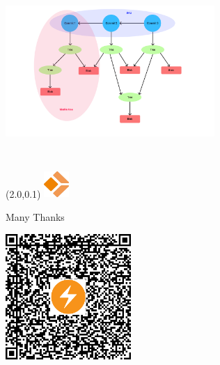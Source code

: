\documentclass[11pt,xcolor={dvipsnames}]{beamer} %
\newcommand{\MyLogo}{%
\begin{textblock}{14}(2.0,0.1)
 \includegraphics[height=1cm, angle=0]{logo}
\end{textblock}
}
\begin{document}
\begin{frame}
	\includegraphics[height=250px,width=300px]{commit-graph.png}
\end{frame}
\begin{frame}
	\transboxin
	\MyLogo
	\vspace{1.0cm}
	\begin{block}{Many Thanks}
		\begin{center}
			\includegraphics[height=180px,width=180px]{invoice.png}
		\end{center}
	\end{block}
\end{frame}
\end{document}
